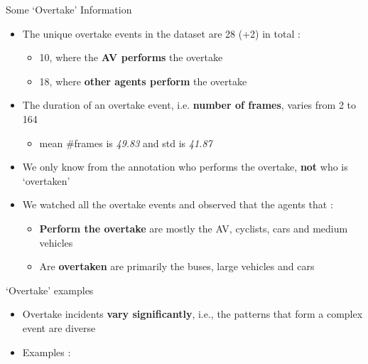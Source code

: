 \documentclass[10pt, aspectratio=169]{beamer}
\begin{document}
\begin{frame}{Some `Overtake' Information}
    \begin{itemize}
        \setlength{\itemsep}{10pt}
        \item  The unique overtake events in the dataset are \textcolor{umBlueLighter}{28 (+2)} in total :
        \vspace{4pt}
        \begin{itemize}
            \setlength{\itemsep}{3pt}
            \item \textcolor{umBlueLighter}{10}, where the \textbf{AV performs} the overtake
            \item \textcolor{umBlueLighter}{18}, where \textbf{other agents perform} the overtake
        \end{itemize}
        \item The duration of an overtake event, i.e. \textbf{number of frames}, varies from \textcolor{umBlueLighter}{2 to 164}
        \vspace{4pt}
        \begin{itemize}
            \item mean \#frames is \textit{49.83} and std is \textit{41.87}
        \end{itemize}
        \item We only know from the annotation who performs the overtake, \textbf{not} who is `overtaken'
        \item We watched all the overtake events and observed that the agents that :
        \vspace{4pt}
        \begin{itemize}
            \setlength{\itemsep}{3pt}
            \item \textbf{Perform the overtake} are mostly the \textcolor{umBlueLighter}{AV}, \textcolor{umBlueLighter}{cyclists}, \textcolor{umBlueLighter}{cars} and \textcolor{umBlueLighter}{medium vehicles}
            \item Are \textbf{overtaken} are primarily the \textcolor{umBlueLighter}{buses}, \textcolor{umBlueLighter}{large vehicles} and \textcolor{umBlueLighter}{cars} 
        \end{itemize}
    \end{itemize}
\end{frame}

\begin{frame}{`Overtake' examples}
    \begin{itemize}
        \setlength{\itemsep}{14pt}
        \item  Overtake incidents \textbf{vary significantly}, i.e., the patterns that form a complex event are diverse
        \item \textcolor{umBlueLighter}{Examples :}
    \end{itemize}
\end{frame}
\end{document}
